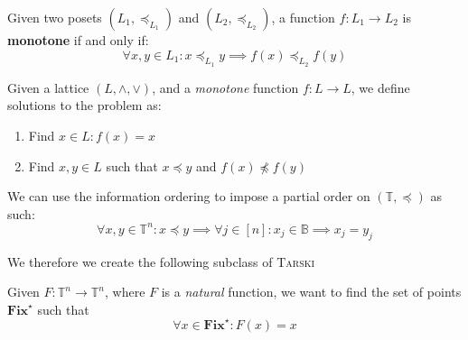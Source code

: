 \begin{definition}
    Given two posets $(L_1, \preceq_{L_1})$ and $(L_2, \preceq_{L_2})$, a function
    $f: L_1 \to L_2$ is \textbf{monotone} if and only if:
    $$
    \forall x,y \in L_1: x \preceq_{L_1} y \implies f(x) \preceq_{L_2} f(y)
    $$
\end{definition}
    



\begin{definition}
    Given a lattice $(L, \wedge, \vee)$, and a \textit{monotone} function $f : L \to L$,
    we define solutions to the problem as:
    \begin{enumerate}
        \item Find $x \in L: f(x) = x$
        \item Find $x,y \in L$ such that $x \preceq y$ and $f(x) \not\preceq f(y)$
    \end{enumerate}
\end{definition}


We can use the information ordering to impose a partial order on $(\mathbb{T}, \preceq)$ as such:
$$
\forall x,y \in \mathbb{T}^n : x \preceq y \implies \forall j \in [n]: x_j \in \mathbb{B} \implies x_j = y_j
$$

We therefore we create the following subclass of \textsc{Tarski}


\begin{definition}
    Given $F: \mathbb{T}^n \to \mathbb{T}^n$, where $F$ is a \textit{natural} function,
    we want to find the set of points $\textbf{Fix}^\star$ such that
    $$
        \forall x \in \textbf{Fix}^\star: F(x)  = x
    $$
\end{definition}



